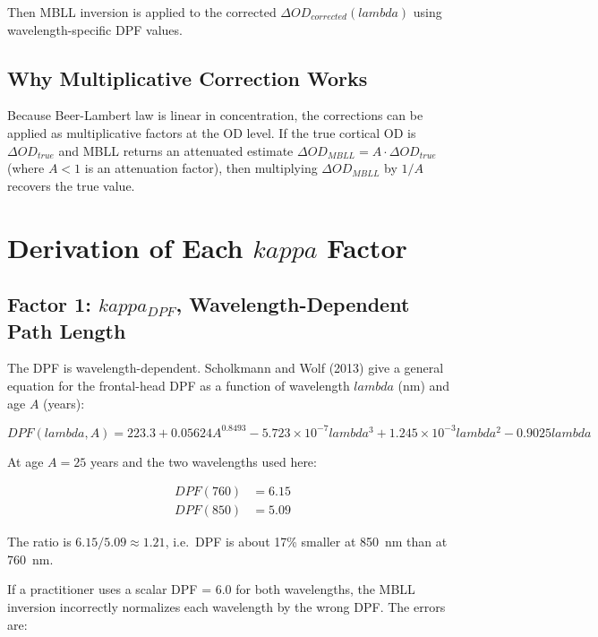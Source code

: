 \documentclass[12pt]{article}
\def\kappa{kappa}%
\def\lambda{lambda}%
\def\text#1{#1}%
\def\,{ }%
\begin{document}
Then MBLL inversion is applied to the corrected $\Delta\text{OD}_{\text{corrected}}(\lambda)$ using wavelength-specific DPF values.

\subsection{Why Multiplicative Correction Works}

Because Beer-Lambert law is linear in concentration, the corrections can be applied as multiplicative factors at the OD level. If the true cortical OD is $\Delta\text{OD}_{\text{true}}$ and MBLL returns an attenuated estimate $\Delta\text{OD}_{\text{MBLL}} = A \cdot \Delta\text{OD}_{\text{true}}$ (where $A < 1$ is an attenuation factor), then multiplying $\Delta\text{OD}_{\text{MBLL}}$ by $1/A$ recovers the true value.

\section{Derivation of Each \texorpdfstring{$\kappa$}{kappa} Factor}

\subsection{Factor 1: \texorpdfstring{$\kappa_{\text{DPF}}$}{kappa\_DPF}, Wavelength-Dependent Path Length}

The DPF is wavelength-dependent. Scholkmann and Wolf (2013) give a general equation for the frontal-head DPF as a function of wavelength $\lambda$ (nm) and age $A$ (years):

\begin{equation}
\text{DPF}(\lambda, A) = 223.3 + 0.05624\,A^{0.8493} - 5.723\times10^{-7}\,\lambda^3 + 1.245\times10^{-3}\,\lambda^2 - 0.9025\,\lambda
\end{equation}

At age $A = 25$ years and the two wavelengths used here:

\begin{align}
\text{DPF}(760) &= 6.15 \\
\text{DPF}(850) &= 5.09
\end{align}

The ratio is $6.15 / 5.09 \approx 1.21$, i.e.\ DPF is about 17\% smaller at 850~nm than at 760~nm.

If a practitioner uses a scalar DPF = 6.0 for both wavelengths, the MBLL inversion incorrectly normalizes each wavelength by the wrong DPF. The errors are:
\end{document}
